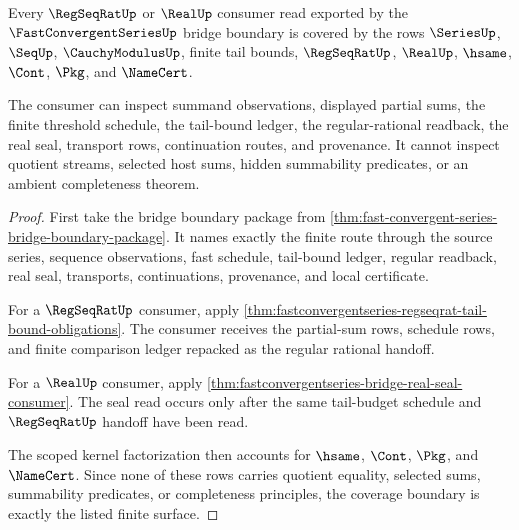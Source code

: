 \begin{theorem}
\label{thm:fastconvergentseries-cauchy-consumer-coverage}
Every $\RegSeqRatUp$ or $\RealUp$ consumer read exported by the $\FastConvergentSeriesUp$ bridge boundary is covered by the rows $\SeriesUp$, $\SeqUp$, $\CauchyModulusUp$, finite tail bounds, $\RegSeqRatUp$, $\RealUp$, $\hsame$, $\Cont$, $\Pkg$, and $\NameCert$.

The consumer can inspect summand observations, displayed partial sums, the finite threshold schedule, the tail-bound ledger, the regular-rational readback, the real seal, transport rows, continuation routes, and provenance. It cannot inspect quotient streams, selected host sums, hidden summability predicates, or an ambient completeness theorem.
\end{theorem}
\begin{proof}
First take the bridge boundary package from \autoref{thm:fast-convergent-series-bridge-boundary-package}. It names exactly the finite route through the source series, sequence observations, fast schedule, tail-bound ledger, regular readback, real seal, transports, continuations, provenance, and local certificate.

For a $\RegSeqRatUp$ consumer, apply \autoref{thm:fastconvergentseries-regseqrat-tail-bound-obligations}. The consumer receives the partial-sum rows, schedule rows, and finite comparison ledger repacked as the regular rational handoff.

For a $\RealUp$ consumer, apply \autoref{thm:fastconvergentseries-bridge-real-seal-consumer}. The seal read occurs only after the same tail-budget schedule and $\RegSeqRatUp$ handoff have been read.

The scoped kernel factorization then accounts for $\hsame$, $\Cont$, $\Pkg$, and $\NameCert$. Since none of these rows carries quotient equality, selected sums, summability predicates, or completeness principles, the coverage boundary is exactly the listed finite surface.
\end{proof}

